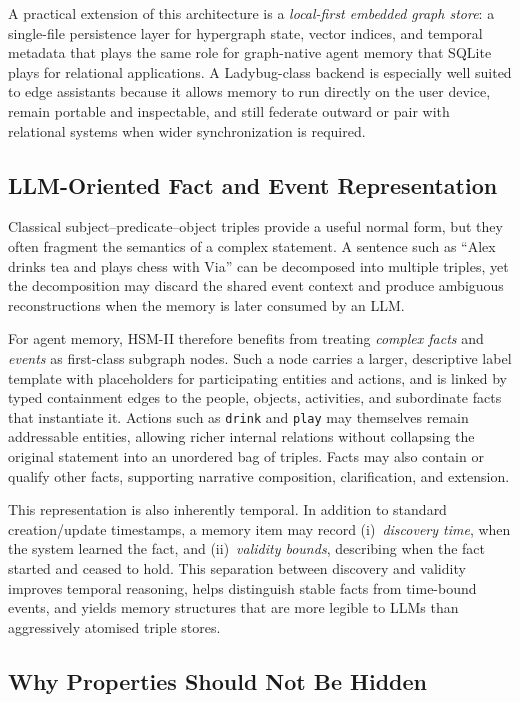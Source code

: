 \documentclass[11pt]{article}
\begin{document}
A practical extension of this architecture is a \emph{local-first embedded graph
store}: a single-file persistence layer for hypergraph state, vector indices, and
temporal metadata that plays the same role for graph-native agent memory that
SQLite plays for relational applications. A Ladybug-class backend is especially
well suited to edge assistants because it allows memory to run directly on the
user device, remain portable and inspectable, and still federate outward or pair
with relational systems when wider synchronization is required.

\subsection{LLM-Oriented Fact and Event Representation}

Classical subject--predicate--object triples provide a useful normal form, but
they often fragment the semantics of a complex statement. A sentence such as
``Alex drinks tea and plays chess with Via'' can be decomposed into multiple
triples, yet the decomposition may discard the shared event context and produce
ambiguous reconstructions when the memory is later consumed by an LLM.

For agent memory, HSM-II therefore benefits from treating \emph{complex facts} and
\emph{events} as first-class subgraph nodes. Such a node carries a larger,
descriptive label template with placeholders for participating entities and
actions, and is linked by typed containment edges to the people, objects,
activities, and subordinate facts that instantiate it. Actions such as
\texttt{drink} and \texttt{play} may themselves remain addressable entities,
allowing richer internal relations without collapsing the original statement into
an unordered bag of triples. Facts may also contain or qualify other facts,
supporting narrative composition, clarification, and extension.

This representation is also inherently temporal. In addition to standard
creation/update timestamps, a memory item may record (i)~\emph{discovery time},
when the system learned the fact, and (ii)~\emph{validity bounds}, describing
when the fact started and ceased to hold. This separation between discovery and
validity improves temporal reasoning, helps distinguish stable facts from
time-bound events, and yields memory structures that are more legible to LLMs
than aggressively atomised triple stores.

\subsection{Why Properties Should Not Be Hidden}
\end{document}
